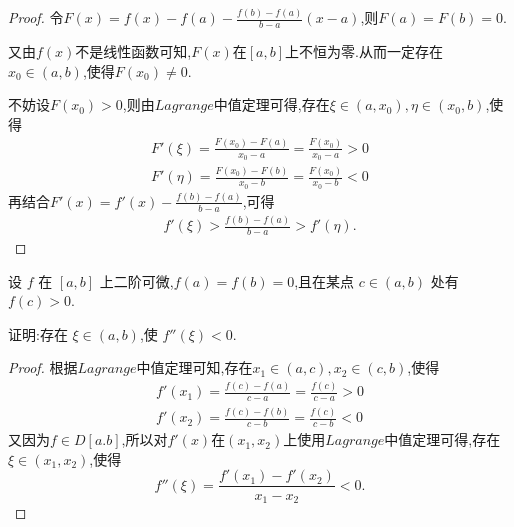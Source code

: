 \documentclass[lang=cn,newtx,10pt,scheme=chinese]{../Template/elegantbook}
\begin{document}
\begin{proof}
    令$F\left( x \right) =f\left( x \right) -f\left( a \right) -\frac{f\left( b \right) -f\left( a \right)}{b-a}\left( x-a \right)$,则$F(a)=F(b)=0$.
    
    又由$f(x)$不是线性函数可知,$F(x)$在$[a,b]$上不恒为零.从而一定存在$x_0\in(a,b)$,使得$F(x_0)\ne0$.
    
    不妨设$F(x_0)>0$,则由$Lagrange$中值定理可得,存在$\xi\in(a,x_0),\eta\in(x_0,b)$,使得
    \begin{gather}
        F'\left( \xi \right) =\frac{F\left( x_0 \right) -F\left( a \right)}{x_0-a}=\frac{F\left( x_0 \right)}{x_0-a}>0
        \nonumber\\
        F'\left( \eta \right) =\frac{F\left( x_0 \right) -F\left( b \right)}{x_0-b}=\frac{F\left( x_0 \right)}{x_0-b}<0        
        \nonumber
    \end{gather}
    再结合$F'(x)=f'(x)-\frac{f\left( b \right) -f\left( a \right)}{b-a}$,可得
    \begin{gather}
        f'(\xi)>\frac{f(b)-f(a)}{b-a}>f'(\eta).
        \nonumber
    \end{gather}
\end{proof}

\begin{exercise}
    设 \( f \) 在 \([a, b]\) 上二阶可微,\( f(a) = f(b) = 0 \),且在某点 \( c \in (a, b) \) 处有 \( f(c) > 0 \).
    
    证明:存在 \(\xi \in (a, b)\),使 \( f''(\xi) < 0 \).    
\end{exercise}
\begin{proof}
    根据$Lagrange$中值定理可知,存在$x_1\in(a,c),x_2\in(c,b)$,使得
    \begin{gather}
        f'\left( x_1 \right) =\frac{f\left( c \right) -f\left( a \right)}{c-a}=\frac{f\left( c \right)}{c-a}>0
        \nonumber\\
        f'\left( x_2 \right) =\frac{f\left( c \right) -f\left( b \right)}{c-b}=\frac{f\left( c \right)}{c-b}<0
        \nonumber
    \end{gather}
    又因为$f\in D[a.b]$,所以对$f'(x)$在$(x_1,x_2)$上使用$Lagrange$中值定理可得,存在$\xi\in(x_1,x_2)$,使得
    \begin{equation}
        f''\left( \xi \right) =\frac{f\prime\left( x_1 \right) -f\prime\left( x_2 \right)}{x_1-x_2}<0.
        \nonumber
    \end{equation}
\end{proof}
\end{document}
